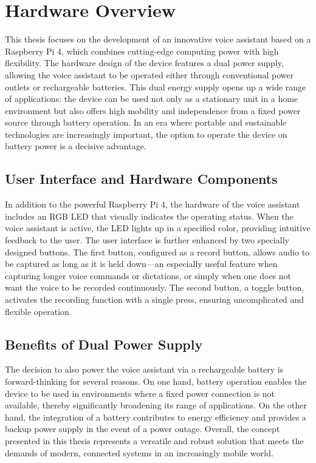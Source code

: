 \renewcommand*\chapterpagestyle{scrheadings}


\section{Hardware Overview}
This thesis focuses on the development of an innovative voice assistant based on a Raspberry Pi 4, which combines cutting-edge computing power with high flexibility. The hardware design of the device features a dual power supply, allowing the voice assistant to be operated either through conventional power outlets or rechargeable batteries. This dual energy supply opens up a wide range of applications: the device can be used not only as a stationary unit in a home environment but also offers high mobility and independence from a fixed power source through battery operation. In an era where portable and sustainable technologies are increasingly important, the option to operate the device on battery power is a decisive advantage.


\subsection{User Interface and Hardware Components}
In addition to the powerful Raspberry Pi 4, the hardware of the voice assistant includes an RGB LED that visually indicates the operating status. When the voice assistant is active, the LED lights up in a specified color, providing intuitive feedback to the user. The user interface is further enhanced by two specially designed buttons. The first button, configured as a record button, allows audio to be captured as long as it is held down—an especially useful feature when capturing longer voice commands or dictations, or simply when one does not want the voice to be recorded continuously. The second button, a toggle button, activates the recording function with a single press, ensuring uncomplicated and flexible operation.


\subsection{Benefits of Dual Power Supply}
The decision to also power the voice assistant via a rechargeable battery is forward-thinking for several reasons. On one hand, battery operation enables the device to be used in environments where a fixed power connection is not available, thereby significantly broadening its range of applications. On the other hand, the integration of a battery contributes to energy efficiency and provides a backup power supply in the event of a power outage. Overall, the concept presented in this thesis represents a versatile and robust solution that meets the demands of modern, connected systems in an increasingly mobile world.

